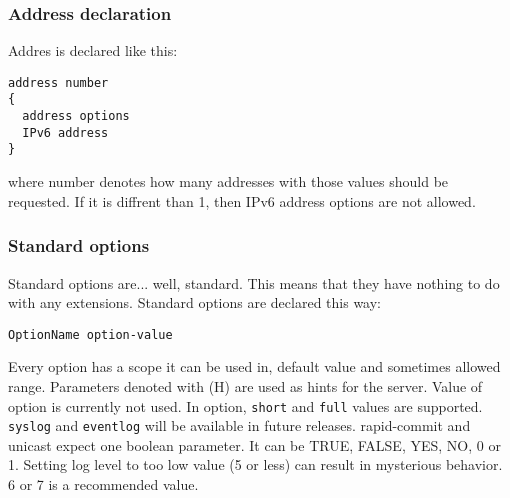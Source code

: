 \subsubsection{Address declaration}
Addres is declared like this:

\begin{verbatim}
address number
{ 
  address options
  IPv6 address
}
\end{verbatim}
where number denotes how many addresses with those values should be
requested. If it is diffrent than 1, then IPv6 address options are not
allowed.

\subsubsection{Standard options}
Standard options are... well, standard. This means that they have 
nothing to do with any extensions. Standard options are declared this way:

\begin{verbatim}
OptionName option-value
\end{verbatim}

Every option has a scope it can be used in, default value and
sometimes allowed range. Parameters denoted with (H) are used as hints
for the server. Value of  option is currently not
used. In  option, \verb+short+ and \verb+full+ values are
supported. \verb+syslog+ and \verb+eventlog+ will be available in
future releases. rapid-commit and unicast expect one boolean
parameter. It can be TRUE, FALSE, YES, NO, 0 or 1. Setting log level
to too low value (5 or less) can result in mysterious behavior. 6 or 7
is a recommended value.


